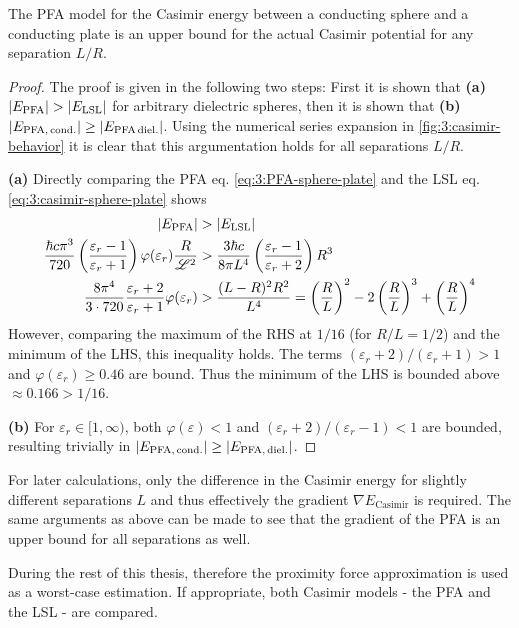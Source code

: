 \begin{theorem}
  The PFA model for the Casimir energy between a conducting sphere and a conducting plate is an upper bound for the actual Casimir potential for any separation $L/R$.
\end{theorem}
\begin{proof}
  The proof is given in the following two steps: First it is shown that \textbf{(a)} $\left\lvert E_\mathrm{PFA}\right\rvert > \left\lvert E_\mathrm{LSL}\right\rvert$ for arbitrary dielectric spheres, then it is shown that \textbf{(b)} $\left\lvert E_\mathrm{PFA,\,cond.}\right\rvert \geq \left\lvert E_\mathrm{PFA\,diel.}\right\rvert$. Using the numerical series expansion in \cref{fig:3:casimir-behavior} it is clear that this argumentation holds for all separations $L/R$.
  
  \textbf{(a)} Directly comparing the PFA eq. \eqref{eq:3:PFA-sphere-plate} and the LSL eq. \eqref{eq:3:casimir-sphere-plate} shows
  \begin{align}
    \left\lvert E_\mathrm{PFA}\right\rvert &> \left\lvert E_\mathrm{LSL}\right\rvert\\
    \frac{\hbar c \pi^3}{720} \left(\frac{\varepsilon_r - 1}{\varepsilon_r + 1}\right)\varphi(\varepsilon_r) \frac{R}{\mathscr{L}^2} &> \frac{3\hbar c}{8 \pi L^4}\left(\frac{\varepsilon_r - 1}{\varepsilon_r + 2}\right) R^3 \\
    \frac{8 \pi^4}{3 \cdot 720} \frac{\varepsilon_r + 2}{\varepsilon_r + 1} \varphi(\varepsilon_r) &> \frac{(L-R)^2 R^2}{L^4} = \left(\frac{R}{L}\right)^2 - 2\left(\frac{R}{L}\right)^3 + \left(\frac{R}{L}\right)^4
  \end{align}
  However, comparing the maximum of the RHS at $1/16$ (for $R/L = 1/2$) and the minimum of the LHS, this inequality holds. The terms $(\varepsilon_r + 2)/(\varepsilon_r + 1) > 1$ and $\varphi(\varepsilon_r) \geq 0.46$ are bound. Thus the minimum of the LHS is bounded above $\approx 0.166 > 1/16$.

  \textbf{(b)} For $\varepsilon_r \in [1,\infty)$, both $\varphi(\varepsilon) < 1$ and $(\varepsilon_r + 2)/(\varepsilon_r - 1) < 1$ are bounded, resulting trivially in $\left\lvert E_\mathrm{PFA,\,cond.}\right\rvert \geq \left\lvert E_\mathrm{PFA,\,diel.}\right\rvert$.
\end{proof}
\begin{remark}
  For later calculations, only the difference in the Casimir energy for slightly different separations $L$ and thus effectively the gradient $\nabla E_\mathrm{Casimir}$ is required. The same arguments as above can be made to see that the gradient of the PFA is an upper bound for all separations as well.
\end{remark}
During the rest of this thesis, therefore the proximity force approximation is used as a worst-case estimation. If appropriate, both Casimir models - the PFA and the LSL - are compared.